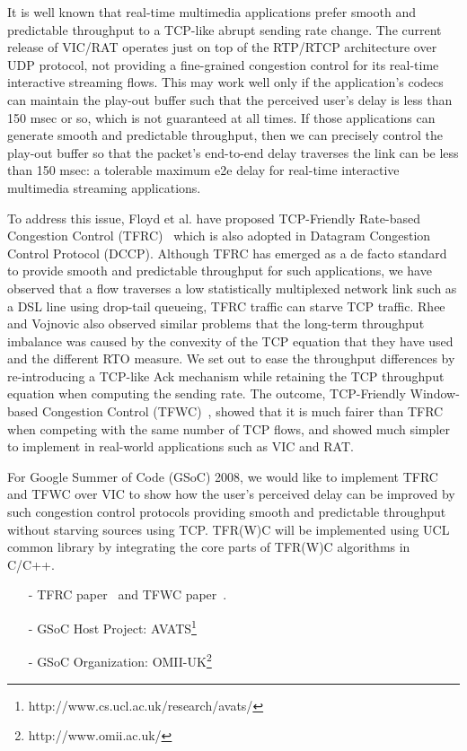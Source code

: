 
It is well known that real-time multimedia applications prefer smooth and
predictable throughput to a TCP-like abrupt sending rate change. The current
release of VIC/RAT operates just on top of the RTP/RTCP architecture over UDP
protocol, not providing a fine-grained congestion control for its real-time
interactive streaming flows. This may work well only if the application's codecs
can maintain the play-out buffer such that the perceived user's delay is less
than 150 msec or so, which is not guaranteed at all times. If those applications
can generate smooth and predictable throughput, then we can precisely control
the play-out buffer so that the packet's end-to-end delay traverses the link can
be less than 150 msec: a tolerable maximum e2e delay for real-time interactive
multimedia streaming applications. 

To address this issue, Floyd et al. have proposed TCP-Friendly Rate-based
Congestion Control (TFRC)~\cite{FHPW00} which is also adopted in Datagram
Congestion Control Protocol (DCCP). Although TFRC has emerged as a de facto
standard to provide smooth and predictable throughput for such applications, we
have observed that a flow traverses a low statistically multiplexed network link
such as a DSL line using drop-tail queueing, TFRC traffic can starve TCP
traffic.  Rhee and Vojnovic also observed similar problems that the long-term
throughput imbalance was caused by the convexity of the TCP equation that they
have used and the different RTO measure. We set out to ease the throughput
differences by re-introducing a TCP-like Ack mechanism while retaining the TCP
throughput equation when computing the sending rate. The outcome, TCP-Friendly
Window-based Congestion Control (TFWC)~\cite{SH06}, showed that it is much
fairer than TFRC when competing with the same number of TCP flows, and showed
much simpler to implement in real-world applications such as VIC and RAT.  

For Google Summer of Code (GSoC) 2008, we would like to implement TFRC and TFWC
over VIC to show how the user's perceived delay can be improved by such
congestion control protocols providing smooth and predictable throughput without
starving sources using TCP. TFR(W)C will be implemented using UCL common library
by integrating the core parts of TFR(W)C algorithms in C/C++.

\vspace{-0.2in} 
\begin{itemize}

\item[-] TFRC paper~\cite{FHPW00} and TFWC paper~\cite{SH06}.

\item[-] GSoC Host Project:
\textsf{AVATS}\footnote{\textsf{http://www.cs.ucl.ac.uk/research/avats/}}

\item[-] GSoC Organization:
\textsf{OMII-UK}\footnote{\textsf{http://www.omii.ac.uk/}}

\end{itemize}

